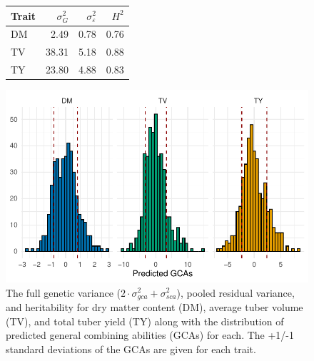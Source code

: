 \begin{figure}

\begin{minipage}[t]{\linewidth}

{\centering 

\hypertarget{tbl-variances}{}
    \caption{\label{tbl-variances}The full genetic variance (\(2\cdot \sigma^2_{gca} + \sigma^2_{sca}\)), pooled residual variance, and
heritability for dry matter content (DM), average tuber volume (TV), and
total tuber yield (TY) along with the distribution of predicted general
combining abilities (GCAs) for each. The +1/-1 standard deviations of
the GCAs are given for each trait. }\tabularnewline

\centering
\begin{tabular}{lrrr}
\toprule
Trait & \(\sigma^2_G\) & \(\sigma^2_{\varepsilon}\) & \(H^2\)\\
\midrule
DM & 2.49 & 0.78 & 0.76\\
TV & 38.31 & 5.18 & 0.88\\
TY & 23.80 & 4.88 & 0.83\\
\bottomrule
\end{tabular}

}

\end{minipage}%
\newline
\begin{minipage}[t]{\linewidth}

{\centering 

\includegraphics{./figs_05/unnamed-chunk-3-1.pdf}

}

\end{minipage}%

\end{figure}

